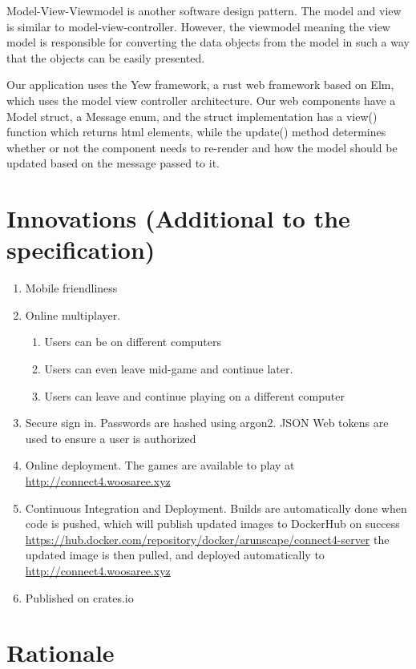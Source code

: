 \documentclass[letterpaper]{article}
\begin{document}
Model-View-Viewmodel is another software design pattern. The model and view is similar to model-view-controller.
However, the viewmodel meaning the view model is responsible for converting the data objects from the model in such
a way that the objects can be easily presented.

Our application uses the Yew framework, a rust web framework based on Elm, which uses the model
view controller architecture. Our web components have a Model struct, a Message enum, and the
struct implementation has a view() function which returns html elements, while the update()
method determines whether or not the component needs to re-render and how the model should be updated
based on the message passed to it.



\section{Innovations (Additional to the specification)}
\begin{enumerate}
    \item Mobile friendliness
    \item Online multiplayer.
        \begin{enumerate}
            \item Users can be on different computers
            \item Users can even leave mid-game and continue later.
            \item Users can leave and continue playing on a different computer
        \end{enumerate}
    \item Secure sign in. Passwords are hashed using argon2. JSON Web tokens are used to ensure a user
        is authorized
    \item Online deployment. The games are available to play at \url{http://connect4.woosaree.xyz}
    \item Continuous Integration and Deployment. Builds are automatically done when code is pushed,
        which will publish updated images to DockerHub on success \url{https://hub.docker.com/repository/docker/arunscape/connect4-server}
        the updated image is then pulled, and deployed automatically to \url{http://connect4.woosaree.xyz}
    \item Published on crates.io

\end{enumerate}

\section{Rationale}
\end{document}

